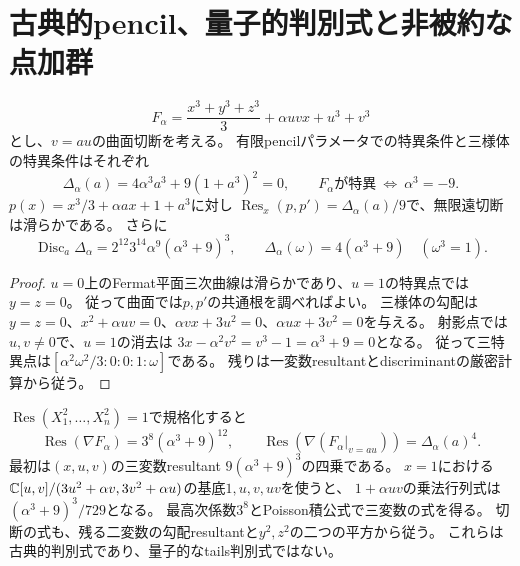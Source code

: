 \section{古典的pencil、量子的判別式と非被約な点加群}
\label{sec:quotient-classical-comparison}
\begin{proposition}[古典的pencilと三様体の判別式]
\[
 F_\alpha=\frac{x^3+y^3+z^3}{3}+\alpha uvx+u^3+v^3
\]
とし、$v=au$の曲面切断を考える。
有限pencilパラメータでの特異条件と三様体の特異条件はそれぞれ
\[
 \Delta_\alpha(a)=4\alpha^3a^3+9(1+a^3)^2=0,\qquad
 F_\alpha\text{が特異}\ \Longleftrightarrow\ \alpha^3=-9.
\]
$p(x)=x^3/3+\alpha ax+1+a^3$に対し
$\operatorname{Res}_x(p,p')=\Delta_\alpha(a)/9$で、無限遠切断は滑らかである。
さらに
\[
 \operatorname{Disc}_a\Delta_\alpha
 =2^{12}3^{14}\alpha^9(\alpha^3+9)^3,\qquad
 \Delta_\alpha(\omega)=4(\alpha^3+9)\quad(\omega^3=1).
\]
\end{proposition}
\begin{proof}
$u=0$上のFermat平面三次曲線は滑らかであり、$u=1$の特異点では$y=z=0$。
従って曲面では$p,p'$の共通根を調べればよい。
三様体の勾配は
$y=z=0$、$x^2+\alpha uv=0$、$\alpha vx+3u^2=0$、$\alpha ux+3v^2=0$を与える。
射影点では$u,v\ne0$で、$u=1$の消去は
$3x-\alpha^2v^2=v^3-1=\alpha^3+9=0$となる。
従って三特異点は$[\alpha^2\omega^2/3:0:0:1:\omega]$である。
残りは一変数resultantとdiscriminantの厳密計算から従う。
\end{proof}
\begin{remark}[重複度を含むresultantの規格化]
$\operatorname{Res}(X_1^2,\ldots,X_n^2)=1$で規格化すると
\[
 \operatorname{Res}(\nabla F_\alpha)=3^8(\alpha^3+9)^{12},\qquad
 \operatorname{Res}(\nabla(F_\alpha|_{v=au}))=\Delta_\alpha(a)^4.
\]
最初は$(x,u,v)$の三変数resultant $9(\alpha^3+9)^3$の四乗である。
$x=1$における$\mathbb C[u,v]/(3u^2+\alpha v,3v^2+\alpha u)$の基底$1,u,v,uv$を使うと、
$1+\alpha uv$の乗法行列式は$(\alpha^3+9)^3/729$となる。
最高次係数$3^8$とPoisson積公式\cite[equation~(2)]{DKSResultant}で三変数の式を得る。
切断の式も、残る二変数の勾配resultantと$y^2,z^2$の二つの平方から従う。
これらは古典的判別式であり、量子的なtails判別式ではない。
\end{remark}


